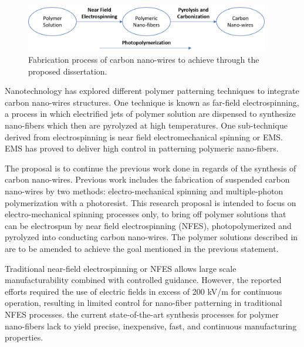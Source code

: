 \begin{figure}[th]
\centering
\includegraphics[width=0.95\textwidth]{./Figures/FabricationProcess.png}
\decoRule
\caption[Fabrication Process]{Fabrication process of carbon nano-wires to achieve through the proposed dissertation.}
\label{fig:fabricationFlowChart}
\end{figure}

Nanotechnology has explored different polymer patterning techniques to integrate carbon nano-wires structures. One technique is known as far-field electrospinning, a process in which electrified jets of polymer solution are dispensed to synthesize nano-fibers which then are pyrolyzed at high temperatures. One sub-technique derived from electrospinning is near field electromechanical spinning or EMS. EMS has proved to deliver high control in patterning polymeric nano-fibers. \cite{Cardenas2017}

The proposal is to continue the previous work done in regards of the synthesis of carbon nano-wires. Previous work includes the fabrication of suspended carbon nano-wires by two methods: electro-mechanical spinning and multiple-photon polymerization with a photoresist. \cite{Cardenas2017} This research proposal is intended to focus on electro-mechanical spinning processes only, to bring off polymer solutions that can be electrospun by near field electrospinning (NFES), photopolymerized and pyrolyzed into conducting carbon nano-wires. The polymer solutions described in \cite{Cardenas2017} are to be amended to achieve the goal mentioned in the previous statement.

Traditional near-field electrospinning or NFES allows large scale manufacturability combined with controlled guidance. \cite{Madou2011} However, the reported efforts required the use of electric fields in excess of 200 kV/m for continuous operation, resulting in limited control for nano-fiber patterning in traditional NFES processes. \cite{Madou2011} the current state-of-the-art synthesis processes for polymer nano-fibers lack to yield precise, inexpensive, fast, and continuous manufacturing properties.






